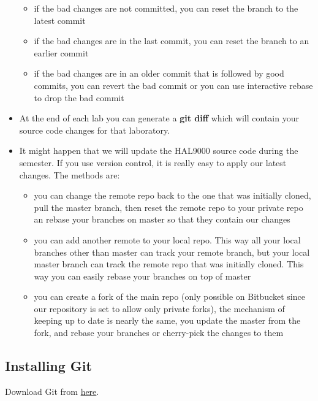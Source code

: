 \begin{appendices}
\begin{itemize}
		\begin{itemize}
			\item if the bad changes are not committed, you can reset the branch to the latest commit
			\item if the bad changes are in the last commit, you can reset the branch to an earlier commit
			\item if the bad changes are in an older commit that is followed by good commits, you can revert the bad commit or you can use interactive rebase to drop the bad commit
		\end{itemize}
	\item At the end of each lab you can generate a \textbf{git diff} which will contain your source code changes for that laboratory.
	\item It might happen that we will update the HAL9000 source code during the semester. If you use version control, it is really easy to apply our latest changes. The methods are:
		\begin{itemize}
			\item you can change the remote repo back to the one that was initially cloned, pull the master branch, then reset the remote repo to your private repo an rebase your branches on master so that they contain our changes
			\item you can add another remote to your local repo. This way all your local branches other than master can track your remote branch, but your local master branch can track the remote repo that was initially cloned. This way you can easily rebase your branches on top of master
			\item you can create a fork of the main repo (only possible on Bitbucket since our repository is set to allow only private forks), the mechanism of keeping up to date is nearly the same, you update the master from the fork, and rebase your branches or cherry-pick the changes to them
		\end{itemize}
\end{itemize}

\FloatBarrier
\subsection{Installing Git}
Download Git from \href{https://git-scm.com/download/win}{here}.


\end{appendices}
